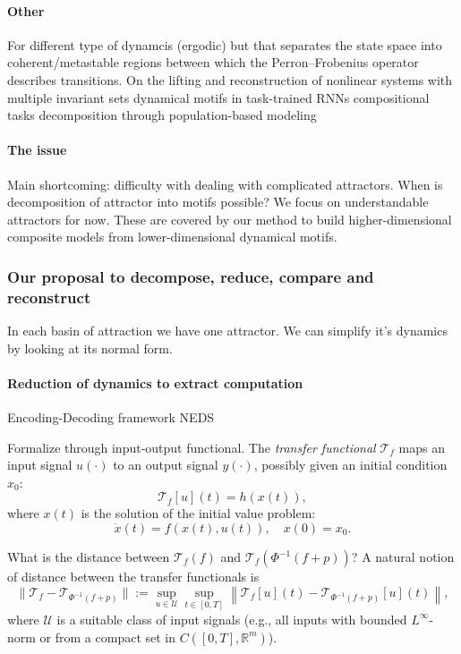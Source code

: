 \documentclass{article}
\theoremstyle{definition} \newtheorem{definition}{Definition}  \newtheorem{example}{Example}
\theoremstyle{remark} \newtheorem{remark}{Remark}
\newcounter{ct}
\begin{document}
\paragraph{Other}
For different type of dynamcis (ergodic) but that separates the state space into coherent/metastable regions between which the Perron–Frobenius operator describes transitions.
%
On the lifting and reconstruction of nonlinear systems with multiple invariant sets \citep{pan2024lifting}
%
dynamical motifs in task-trained RNNs \citep{driscoll2024flexible}
%
compositional tasks \citep{tafazoli2024building}
%
decomposition through population-based modeling\citep{glaser2020recurrent} 
%
\citep{mudrik2024decomposed}
\citep{yuste2024ensembles}

\paragraph{The issue}
Main shortcoming: difficulty with dealing with complicated attractors.
When is decomposition of attractor into motifs possible?
We focus on understandable attractors for now. 
These are covered by our method to build higher-dimensional composite models from lower-dimensional dynamical motifs.

\subsubsection{Our proposal to decompose, reduce, compare and reconstruct}
In each basin of attraction we have one attractor.
We can simplify it's dynamics by looking at its normal form.

\paragraph{Reduction of dynamics to extract computation}
Encoding-Decoding framework
\citep{zhang2025neural} NEDS

Formalize through input-output functional.
The \emph{transfer functional} \( \mathcal{T}_f \) maps an input signal \( u(\cdot) \) to an output signal \( y(\cdot) \), possibly given an initial condition \( x_0 \):
\[
\mathcal{T}_f[u](t) = h(x(t)),
\]
where \( x(t) \) is the solution of the initial value problem:
\[
\dot{x}(t) = f(x(t), u(t)), \quad x(0) = x_0.
\]

What is the distance between $\mathcal{T}_f(f)$ and $\mathcal{T}_f(\Phi^{-1}(f+p))$?
A natural notion of distance between the transfer functionals is
\[
\|\mathcal{T}_f - \mathcal{T}_{\Phi^{-1}(f+p)}\| 
:= \sup_{u \in \mathcal{U}} \sup_{t \in [0, T]} 
\left\| \mathcal{T}_f[u](t) - \mathcal{T}_{\Phi^{-1}(f+p)}[u](t) \right\|,
\]
where \( \mathcal{U} \) is a suitable class of input signals (e.g., all inputs with bounded \( L^\infty \)-norm or from a compact set in \( C([0,T], \mathbb{R}^m) \)).
\end{document}
